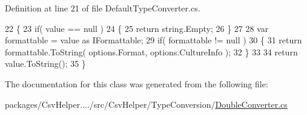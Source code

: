 Definition at line 21 of file Default\-Type\-Converter.\-cs.


\begin{DoxyCode}
22         \{
23             \textcolor{keywordflow}{if}( value == null )
24             \{
25                 \textcolor{keywordflow}{return} string.Empty;
26             \}
27 
28             var formattable = value as IFormattable;
29             \textcolor{keywordflow}{if}( formattable != null )
30             \{
31                 \textcolor{keywordflow}{return} formattable.ToString( options.Format, options.CultureInfo );
32             \}
33 
34             \textcolor{keywordflow}{return} value.ToString();
35         \}
\end{DoxyCode}


The documentation for this class was generated from the following file\-:\begin{DoxyCompactItemize}
\item 
packages/\-Csv\-Helper..../src/\-Csv\-Helper/\-Type\-Conversion/\hyperlink{a00245}{Double\-Converter.\-cs}\end{DoxyCompactItemize}
